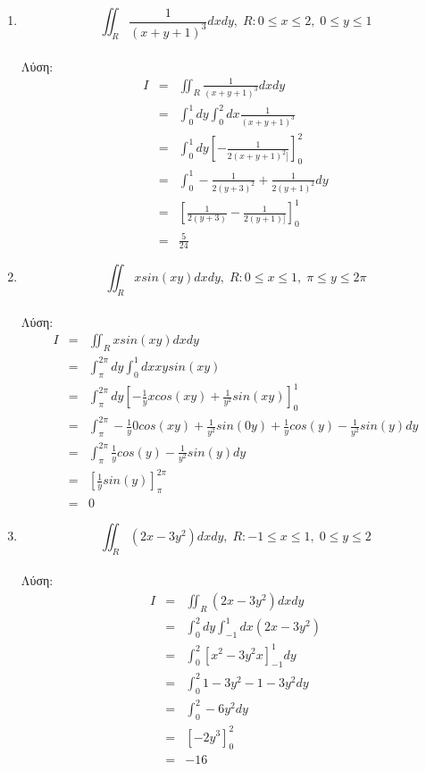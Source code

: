 \documentclass{article}
\begin{document}
{\begin{enumerate}
\begin{enumerate}{}
\item $$\iint _{R} \frac{1}{(x+y+1)^3}dxdy,\;R:0\leq x\leq 2,\; 0\leq y \leq 1$$ \\
Λύση:
\begin{eqnarray*}
I &=& \iint _{R} \frac{1}{(x+y+1)^3}dxdy \\
& = & \int _{0} ^{1} dy \int _{0}^{2} dx \frac{1}{(x+y+1)^3} \\
& = & \int _{0} ^{1} dy \left[ -\frac{1}{2(x+y+1)^2]} \right]^2_0 \\
& = & \int _{0} ^{1} -\frac{1}{2(y+3)^2} + \frac{1}{2(y+1)^2} dy\\
& = & \left[ \frac{1}{2(y+3)} -\frac{1}{2(y+1)]} \right]^1_0 \\
& = & \frac{5}{24}
\end{eqnarray*}

\item $$\iint _{R} xsin(xy)dxdy,\;R:0\leq x\leq 1,\; \pi\leq y \leq 2\pi$$ \\
Λύση:
\begin{eqnarray*}
I &=& \iint _{R} xsin(xy)dxdy \\
& = & \int _{\pi} ^{2\pi} dy \int _{0}^{1} dx xysin(xy) \\
& = & \int _{\pi} ^{2\pi} dy \left[ -\frac{1}{y}xcos(xy) + \frac{1}{y^2}sin(xy) \right]^1_0 \\
& = & \int _{\pi} ^{2\pi} -\frac{1}{y}0cos(xy) + \frac{1}{y^2}sin(0y) + \frac{1}{y}cos(y) -\frac{1}{y^2}sin(y) dy\\
& = &  \int _{\pi} ^{2\pi} \frac{1}{y}cos(y) -\frac{1}{y^2}sin(y) dy\\
& = & \left[ \frac{1}{y}sin(y) \right]^{2\pi}_{\pi} \\
& = & 0
\end{eqnarray*}

\item $$\iint _{R} (2x-3y^2)dxdy,\;R:-1\leq x\leq 1,\; 0\leq y \leq 2$$ \\
Λύση:
\begin{eqnarray*}
I &=& \iint _{R} (2x-3y^2)dxdy \\
& = & \int _{0} ^{2} dy \int_{-1}^{1} dx (2x-3y^2) \\
& = & \int _{0} ^{2} \left[ x^2-3y^2x \right]^1_{-1} dy\\
& = & \int _{0} ^{2} 1-3y^2-1-3y^2 dy\\
& = & \int _{0} ^{2} -6y^2 dy\\
& = & \left[ -2y^3 \right]^2_0\\
& = & -16
\end{eqnarray*}


\end{enumerate}
\end{enumerate}}
\end{document}
